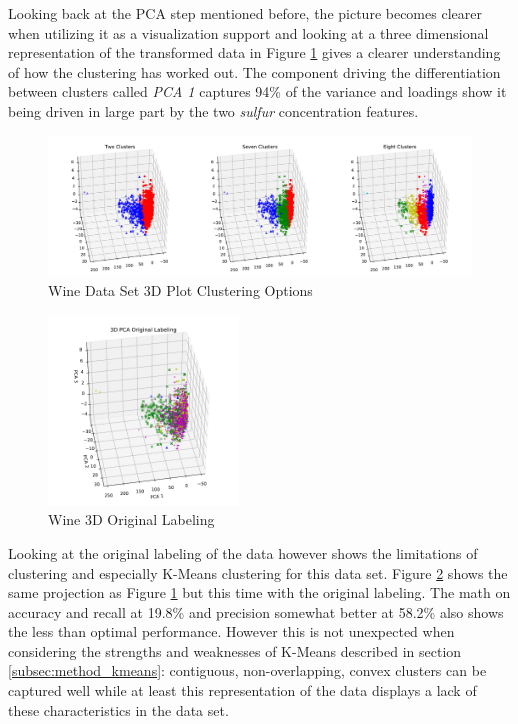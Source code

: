 Looking back at the PCA step mentioned before, the picture becomes clearer when utilizing it as a visualization support and looking at a three dimensional representation of the transformed data in Figure \ref{fig:kmeans_wine_3d_multi} gives a clearer understanding of how the clustering has worked out. The component driving the differentiation between clusters called \textit{PCA 1} captures 94\% of the variance and loadings show it being driven in large part by the two \textit{sulfur} concentration features.

\begin{figure}[H]
\centering
\includegraphics[width=1.0\textwidth]{images/kmeans_wine_3d_multi.pdf}
\caption{Wine Data Set 3D Plot Clustering Options}
\label{fig:kmeans_wine_3d_multi}
\end{figure}

\vspace{-0.5cm}
\begin{figure}
  \centering
    \includegraphics[trim={1cm 0cm 1cm 1cm},width=0.45\textwidth, clip]{images/kmeans_wine_pca_original.pdf}
  \caption{Wine 3D Original Labeling}
  \label{fig:kmeans_wine_pca_original}
\end{figure}

Looking at the original labeling of the data however shows the limitations of clustering and especially K-Means clustering for this data set. Figure \ref{fig:kmeans_wine_pca_original} shows the same projection as Figure \ref{fig:kmeans_wine_3d_multi} but this time with the original labeling. The math on accuracy and recall at 19.8\% and precision somewhat better at 58.2\% also shows the less than optimal performance. However this is not unexpected when considering the strengths and weaknesses of K-Means described in section \ref{subsec:method_kmeans}: contiguous, non-overlapping, convex clusters can be captured well while at least this representation of the data displays a lack of these characteristics in the data set.


